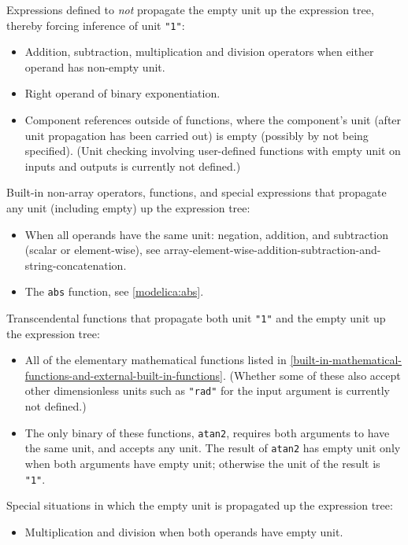 Expressions defined to \emph{not} propagate the empty unit up the expression tree, thereby forcing inference of unit \lstinline!"1"!:
\begin{itemize}
\item
  Addition, subtraction, multiplication and division operators when either operand has non-empty unit.
\item
  Right operand of binary exponentiation.
\item
  Component references outside of functions, where the component's unit (after unit propagation has been carried out) is empty (possibly by not being specified).
  (Unit checking involving user-defined functions with empty unit on inputs and outputs is currently not defined.)
\end{itemize}

Built-in non-array operators, functions, and special expressions that propagate any unit (including empty) up the expression tree:
\begin{itemize}
\item
  When all operands have the same unit: negation, addition, and subtraction (scalar or element-wise), see {array-element-wise-addition-subtraction-and-string-concatenation}.
\item
  The \lstinline!abs! function, see \cref{modelica:abs}.
\end{itemize}

Transcendental functions that propagate both unit \lstinline!"1"! and the empty unit up the expression tree:
\begin{itemize}
\item
  All of the elementary mathematical functions listed in \cref{built-in-mathematical-functions-and-external-built-in-functions}.
  (Whether some of these also accept other dimensionless units such as \lstinline!"rad"! for the input argument is currently not defined.)
\item
  The only binary of these functions, \lstinline!atan2!, requires both arguments to have the same unit, and accepts any unit.
  The result of \lstinline!atan2! has empty unit only when both arguments have empty unit; otherwise the unit of the result is \lstinline!"1"!.
\end{itemize}

Special situations in which the empty unit is propagated up the expression tree:
\begin{itemize}
\item
  Multiplication and division when both operands have empty unit.
\end{itemize}


